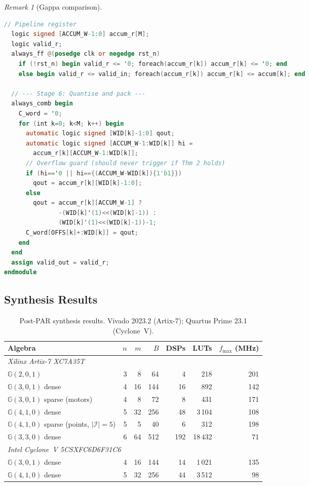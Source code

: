 \documentclass[11pt,a4paper]{article}
\theoremstyle{definition}
\theoremstyle{plain}
\theoremstyle{remark}
\newtheorem{remark}{Remark}[section]
\newcommand{\GA}{\mathbb{G}}
\begin{document}
\begin{remark}[Gappa comparison]
\begin{lstlisting}[language=Verilog,
  caption={L-ALU tile $\GA(3,0,1)$, $m=16$, pipelined, synthesisable},
  label=lst:verilog-v3]
  // Pipeline register
  logic signed [ACCUM_W-1:0] accum_r[M];
  logic valid_r;
  always_ff @(posedge clk or negedge rst_n)
    if (!rst_n) begin valid_r <= '0; foreach(accum_r[k]) accum_r[k] <= '0; end
    else begin valid_r <= valid_in; foreach(accum_r[k]) accum_r[k] <= accum[k]; end

  // --- Stage 6: Quantise and pack ---
  always_comb begin
    C_word = '0;
    for (int k=0; k<M; k++) begin
      automatic logic signed [WID[k]-1:0] qout;
      automatic logic signed [ACCUM_W-1:WID[k]] hi =
        accum_r[k][ACCUM_W-1:WID[k]];
      // Overflow guard (should never trigger if Thm 2 holds)
      if (hi=='0 || hi=={(ACCUM_W-WID[k]){1'b1}})
        qout = accum_r[k][WID[k]-1:0];
      else
        qout = accum_r[k][ACCUM_W-1] ?
               -(WID[k]'(1)<<(WID[k]-1)) :
               (WID[k]'(1)<<(WID[k]-1))-1;
      C_word[OFFS[k]+:WID[k]] = qout;
    end
  end
  assign valid_out = valid_r;
endmodule
\end{lstlisting}

\subsection{Synthesis Results}

\begin{table}[h]
\centering
\caption{Post-PAR synthesis results.
Vivado 2023.2 (Artix-7); Quartus Prime 23.1 (Cyclone~V).}
\label{tab:synth}
\begin{tabular}{lrrrrrr}
\toprule
Algebra & $n$ & $m$ & $B$ & DSPs & LUTs & $f_{\max}$ (MHz) \\
\midrule
\multicolumn{7}{l}{\emph{Xilinx Artix-7 XC7A35T}} \\
$\GA(2,0,1)$ & 3 & 8 & 64 & 4 & 218 & 201 \\
$\GA(3,0,1)$ dense & 4 & 16 & 144 & 16 & 892 & 142 \\
$\GA(3,0,1)$ sparse (motors) & 4 & 8 & 72 & 8 & 431 & 171 \\
$\GA(4,1,0)$ dense & 5 & 32 & 256 & 48 & 3\,104 & 108 \\
$\GA(4,1,0)$ sparse (points, $|\mathcal{I}|=5$) & 5 & 5 & 40 & 6 & 312 & 198 \\
$\GA(3,3,0)$ dense & 6 & 64 & 512 & 192 & 18\,432 & 71 \\
\midrule
\multicolumn{7}{l}{\emph{Intel Cyclone~V 5CSXFC6D6F31C6}} \\
$\GA(3,0,1)$ dense & 4 & 16 & 144 & 14 & 1\,021 & 135 \\
$\GA(4,1,0)$ dense & 5 & 32 & 256 & 44 & 3\,512 & 98 \\
\bottomrule
\end{tabular}
\end{table}


\end{remark}
\end{document}
